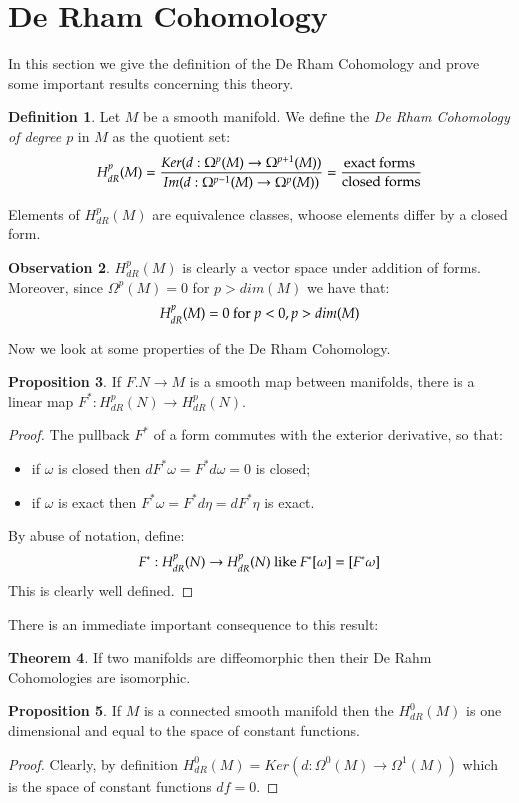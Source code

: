 \documentclass[12pt,a4paper]{report}
\theoremstyle{definition}
\newtheorem{Def}{Definition}[chapter]
\theoremstyle{Theorem}
\newtheorem{Theo}[Def]{Theorem}
\newtheorem{Prop}[Def]{Proposition}
\theoremstyle{break}
\theoremstyle{definition}
\newtheorem{Obs}[Def]{Observation}
\begin{document}
	\section{De Rham Cohomology}
	In this section we give the definition of the De Rham Cohomology and prove some important results concerning this theory.
	\begin{Def}
		Let $M$ be a smooth manifold. We define the \textit{De Rham Cohomology of degree $p$} in $M$ as the quotient set:
		$$H_{dR}^p(M)={Ker(d:\Omega^p(M)\rightarrow \Omega^{p+1}(M))\over Im(d:\Omega^{p-1}(M)\rightarrow \Omega^{p}(M))}={\hbox{exact forms }\over \hbox{closed forms}}$$ 
	\end{Def}
	Elements of $H_{dR}^p(M)$ are equivalence classes, whoose elements differ by a closed form.
	\begin{Obs}
		$H_{dR}^p(M)$ is clearly a vector space under addition of forms. Moreover, since $\Omega^p(M)=0$ for $p>dim(M)$ we have that:
		$$H^p_{dR}(M)=0\hbox{ for }p<0,p>dim(M)$$
	\end{Obs}
	Now we look at some properties of the De Rham Cohomology.
	\begin{Prop}
		If $F.N\rightarrow M$ is a smooth map between manifolds, there is a linear map $F^*:H^p_{dR}(N)\rightarrow H^p_{dR}(N)$.
	\end{Prop}
	\begin{proof}
		The pullback $F^*$ of a form commutes with the exterior derivative, so that:
		\begin{itemize}
			\item if $\omega$ is closed then $dF^*\omega=F^*d\omega=0$ is closed;
			\item if $\omega$ is exact then $F^*\omega=F^*d\eta=dF^*\eta$ is exact.
		\end{itemize}
		By abuse of notation, define:
		$$F^*:H^p_{dR}(N)\rightarrow H^p_{dR}(N) \hbox{ like }F^*[\omega]=[F^*\omega]$$
		This is clearly well defined.
	\end{proof}
	There is an immediate important consequence to this result:
	\begin{Theo}
		If two manifolds are diffeomorphic then their De Rahm Cohomologies are isomorphic.
	\end{Theo}
	\begin{Prop}
		If $M$ is a connected smooth manifold then the $H^0_{dR}(M)$ is one dimensional and equal to the space of constant functions.
	\end{Prop}
	\begin{proof}
		Clearly, by definition $H^0_{dR}(M)=Ker(d:\Omega^0(M)\rightarrow\Omega^1(M))$ which is the space of constant functions $df=0$.
	\end{proof}
\end{document}
